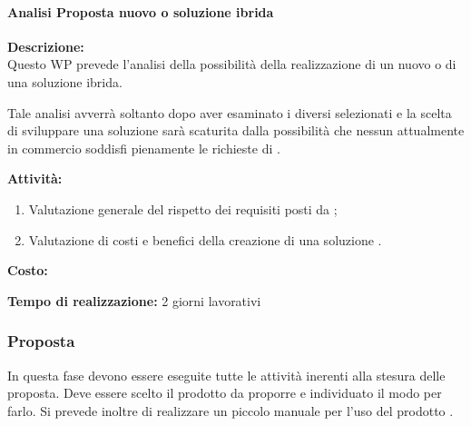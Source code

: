 \paragraph{Analisi Proposta nuovo \sw o soluzione ibrida }
\begin{description}
\item{\bfseries Descrizione:}\\
Questo WP prevede l'analisi della possibilità della realizzazione di un nuovo \sw o di una soluzione ibrida.

Tale analisi avverrà soltanto dopo aver esaminato i diversi \sw selezionati e la scelta di sviluppare una soluzione  sarà scaturita dalla possibilità che nessun \sw attualmente in commercio soddisfi pienamente le richieste di \customer.

\item  {\bfseries Attività:}
	\begin{enumerate}
    \item Valutazione generale del rispetto dei requisiti posti da \customer;
	  \item Valutazione di costi e benefici della creazione di una soluzione  .
	\end{enumerate}
\item  {\bfseries Costo:}
\item  {\bfseries Tempo di realizzazione:} 2 giorni lavorativi
\end{description}

\subsubsection{Proposta}
In questa fase devono essere eseguite tutte le attività inerenti alla stesura delle proposta. Deve essere scelto il prodotto da proporre e individuato il modo per farlo. Si prevede inoltre di realizzare un piccolo manuale per l'uso del prodotto \sw.

